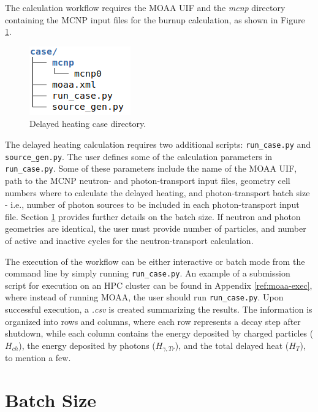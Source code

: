 \label{ap:mcnp_fixed}

The calculation workflow requires the MOAA UIF and the \textit{mcnp} directory containing the MCNP input files for the burnup calculation, as shown in Figure \ref{fig:tree2}.

\begin{figure}[htbp!]
  \begin{center}
    \includegraphics[width=0.23\linewidth]{figures/dh_case_directory}
  \end{center}
  \caption{Delayed heating case directory.}
  \label{fig:tree2}
\end{figure}

The delayed heating calculation requires two additional scripts: \texttt{run\_case.py} and \texttt{source\_gen.py}.
The user defines some of the calculation parameters in \texttt{run\_case.py}.
Some of these parameters include the name of the MOAA UIF, path to the MCNP neutron- and photon-transport input files, geometry cell numbers where to calculate the delayed heating, and photon-transport batch size - i.e., number of photon sources to be included in each photon-transport input file.
Section \ref{ap:batchsize} provides further details on the batch size.
If neutron and photon geometries are identical, the user must provide number of particles, and number of active and inactive cycles for the neutron-transport calculation.

The execution of the workflow can be either interactive or batch mode from the command line by simply running \texttt{run\_case.py}.
An example of a submission script for execution on an \gls*{HPC} cluster can be found in Appendix \ref{ref:moaa-exec}, where instead of running MOAA, the user should run \texttt{run\_case.py}.
Upon successful execution, a \textit{.csv} is created summarizing the results.
The information is organized into rows and columns, where each row represents a decay step after shutdown, while each column contains the energy deposited by charged particles ($H_{ch}$), the energy deposited by photons ($H_{\gamma, Tr}$), and the total delayed heat ($H_T$), to mention a few.

\section{Batch Size}
\label{ap:batchsize}

